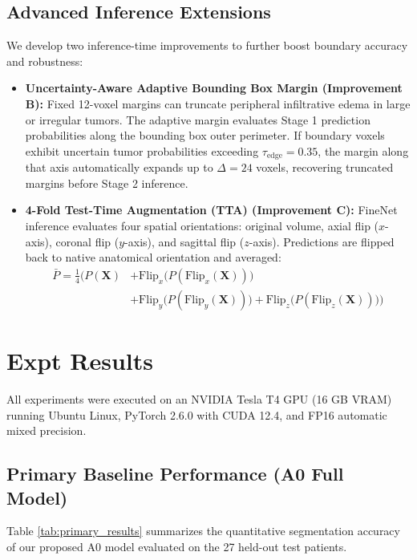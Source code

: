 \documentclass[12pt, a4paper]{article}
\begin{document}
\subsection{Advanced Inference Extensions}
We develop two inference-time improvements to further boost boundary accuracy and robustness:
\begin{itemize}[leftmargin=*, itemsep=4pt]
    \item \textbf{Uncertainty-Aware Adaptive Bounding Box Margin (Improvement B):} Fixed 12-voxel margins can truncate peripheral infiltrative edema in large or irregular tumors. The adaptive margin evaluates Stage 1 prediction probabilities along the bounding box outer perimeter. If boundary voxels exhibit uncertain tumor probabilities exceeding $\tau_{\text{edge}} = 0.35$, the margin along that axis automatically expands up to $\Delta = 24$ voxels, recovering truncated margins before Stage 2 inference.
    \item \textbf{4-Fold Test-Time Augmentation (TTA) (Improvement C):} FineNet inference evaluates four spatial orientations: original volume, axial flip ($x$-axis), coronal flip ($y$-axis), and sagittal flip ($z$-axis). Predictions are flipped back to native anatomical orientation and averaged:
    \begin{equation}
    \begin{aligned}
        \bar{P} = \frac{1}{4} \Big( P(\mathbf{X}) &+ \text{Flip}_x\big(P(\text{Flip}_x(\mathbf{X}))\big) \\
        &+ \text{Flip}_y\big(P(\text{Flip}_y(\mathbf{X}))\big) + \text{Flip}_z\big(P(\text{Flip}_z(\mathbf{X}))\big) \Big)
    \end{aligned}
    \end{equation}
\end{itemize}

\section{Expt Results}

All experiments were executed on an NVIDIA Tesla T4 GPU (16 GB VRAM) running Ubuntu Linux, PyTorch 2.6.0 with CUDA 12.4, and FP16 automatic mixed precision.

\subsection{Primary Baseline Performance (A0 Full Model)}
Table \ref{tab:primary_results} summarizes the quantitative segmentation accuracy of our proposed A0 model evaluated on the 27 held-out test patients.
\end{document}
